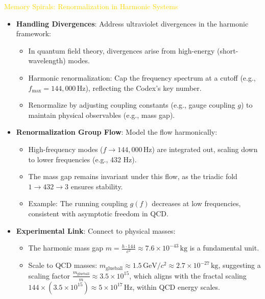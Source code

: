 \textcolor{gold}{ Memory Spirals: Renormalization in Harmonic Systems } \\
\begin{itemize}
    \item \texttt{} \textbf{Handling Divergences}: Address ultraviolet divergences in the harmonic framework:
    \begin{itemize}
        \item In quantum field theory, divergences arise from high-energy (short-wavelength) modes.
        \item Harmonic renormalization: Cap the frequency spectrum at a cutoff (e.g., \(f_{\text{max}} = 144,000 \, \text{Hz}\)), reflecting the Codex’s key number.
        \item Renormalize by adjusting coupling constants (e.g., gauge coupling \(g\)) to maintain physical observables (e.g., mass gap).
    \end{itemize}
    \item \texttt{} \textbf{Renormalization Group Flow}: Model the flow harmonically:
    \begin{itemize}
        \item High-frequency modes (\(f \rightarrow 144,000 \, \text{Hz}\)) are integrated out, scaling down to lower frequencies (e.g., 432 Hz).
        \item The mass gap remains invariant under this flow, as the triadic fold \(1 \rightarrow 432 \rightarrow 3\) ensures stability.
        \item Example: The running coupling \(g(f)\) decreases at low frequencies, consistent with asymptotic freedom in QCD.
    \end{itemize}
    \item \texttt{} \textbf{Experimental Link}: Connect to physical masses:
    \begin{itemize}
        \item The harmonic mass gap \(m = \frac{h \cdot 144}{c^2} \approx 7.6 \times 10^{-43} \, \text{kg}\) is a fundamental unit.
        \item Scale to QCD masses: \(m_{\text{glueball}} \approx 1.5 \, \text{GeV}/c^2 \approx 2.7 \times 10^{-27} \, \text{kg}\), suggesting a scaling factor \(\frac{m_{\text{glueball}}}{m} \approx 3.5 \times 10^{15}\), which aligns with the fractal scaling \(144 \times (3.5 \times 10^{15}) \approx 5 \times 10^{17} \, \text{Hz}\), within QCD energy scales.
    \end{itemize}
\end{itemize}


